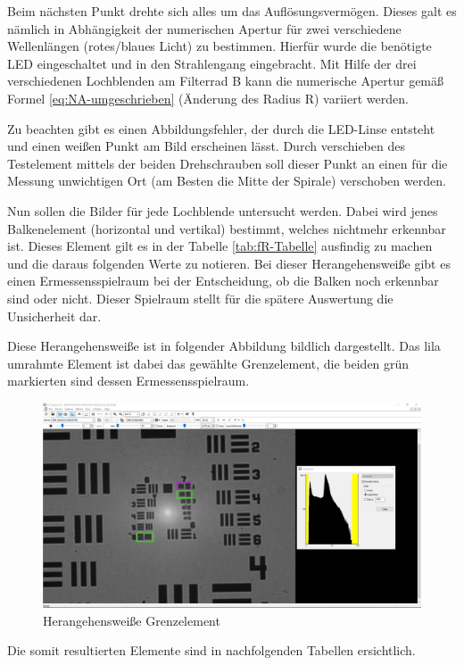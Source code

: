 \documentclass[12pt,a4paper,twoside]{article}
\begin{document}
Beim nächsten Punkt drehte sich alles um das Auflösungsvermögen. Dieses galt es nämlich in Abhängigkeit der numerischen Apertur für zwei verschiedene Wellenlängen (rotes/blaues Licht) zu bestimmen. 
Hierfür wurde die benötigte LED eingeschaltet und in den Strahlengang eingebracht. Mit Hilfe der drei verschiedenen Lochblenden am Filterrad B kann die numerische Apertur gemäß Formel \ref{eq:NA-umgeschrieben} (Änderung des Radius R) variiert werden. \newline

\noindent
Zu beachten gibt es einen Abbildungsfehler, der durch die LED-Linse entsteht und einen weißen Punkt am Bild erscheinen lässt. Durch verschieben des Testelement mittels der beiden Drehschrauben soll dieser Punkt an einen für die Messung unwichtigen Ort (am Besten die Mitte der Spirale) verschoben werden. \newline

\noindent
Nun sollen die Bilder für jede Lochblende untersucht werden. Dabei wird jenes Balkenelement (horizontal und vertikal) bestimmt, welches nichtmehr erkennbar ist. Dieses Element gilt es in der Tabelle \ref{tab:fR-Tabelle} ausfindig zu machen und die daraus folgenden Werte zu notieren.
Bei dieser Herangehensweiße gibt es einen Ermessensspielraum bei der Entscheidung, ob die Balken noch erkennbar sind oder nicht. Dieser Spielraum stellt für die spätere Auswertung die Unsicherheit dar. \newline

\noindent
Diese Herangehensweiße ist in folgender Abbildung bildlich dargestellt. Das lila umrahmte Element ist dabei das gewählte Grenzelement, die beiden grün markierten sind dessen Ermessensspielraum.
\begin{figure}[H]
    \centering
    \includegraphics[width=0.5\linewidth]{nudes/AbbeTheorie/Aufgabe 1/blau/blende6blauMarkiert.png}
    \caption{Herangehensweiße Grenzelement}
    \label{fig:HerangehensweißeA1}
\end{figure}

\noindent
Die somit resultierten Elemente sind in nachfolgenden Tabellen ersichtlich.
\end{document}
